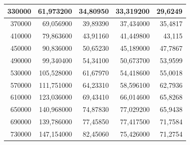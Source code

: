 \documentclass[a4paper, 12pt]{article}
\begin{document}
\begin{longtable}[c]{@{}rrrrr@{}}
	\multicolumn{1}{|r|}{330000}                  & \multicolumn{1}{r|}{61,973200}     & \multicolumn{1}{r|}{34,80950}      & \multicolumn{1}{r|}{33,319200}     & \multicolumn{1}{r|}{29,6249}       \\* \midrule
	\multicolumn{1}{|r|}{370000}                  & \multicolumn{1}{r|}{69,056900}     & \multicolumn{1}{r|}{39,89390}      & \multicolumn{1}{r|}{37,434000}     & \multicolumn{1}{r|}{35,4817}       \\* \midrule
	\multicolumn{1}{|r|}{410000}                  & \multicolumn{1}{r|}{79,863600}     & \multicolumn{1}{r|}{43,91160}      & \multicolumn{1}{r|}{41,449800}     & \multicolumn{1}{r|}{43,115}        \\* \midrule
	\multicolumn{1}{|r|}{450000}                  & \multicolumn{1}{r|}{90,836000}     & \multicolumn{1}{r|}{50,65230}      & \multicolumn{1}{r|}{45,189000}     & \multicolumn{1}{r|}{47,7867}       \\* \midrule
	\multicolumn{1}{|r|}{490000}                  & \multicolumn{1}{r|}{99,340400}     & \multicolumn{1}{r|}{54,34100}      & \multicolumn{1}{r|}{50,673700}     & \multicolumn{1}{r|}{53,9599}       \\* \midrule
	\multicolumn{1}{|r|}{530000}                  & \multicolumn{1}{r|}{105,528000}    & \multicolumn{1}{r|}{61,67970}      & \multicolumn{1}{r|}{54,418600}     & \multicolumn{1}{r|}{55,0018}       \\* \midrule
	\multicolumn{1}{|r|}{570000}                  & \multicolumn{1}{r|}{111,751000}    & \multicolumn{1}{r|}{64,23310}      & \multicolumn{1}{r|}{58,596100}     & \multicolumn{1}{r|}{62,7936}       \\* \midrule
	\multicolumn{1}{|r|}{610000}                  & \multicolumn{1}{r|}{123,036000}    & \multicolumn{1}{r|}{69,43410}      & \multicolumn{1}{r|}{66,014600}     & \multicolumn{1}{r|}{65,8268}       \\* \midrule
	\multicolumn{1}{|r|}{650000}                  & \multicolumn{1}{r|}{140,968000}    & \multicolumn{1}{r|}{74,87830}      & \multicolumn{1}{r|}{77,029200}     & \multicolumn{1}{r|}{65,9438}       \\* \midrule
	\multicolumn{1}{|r|}{690000}                  & \multicolumn{1}{r|}{139,786000}    & \multicolumn{1}{r|}{77,45850}      & \multicolumn{1}{r|}{77,417500}     & \multicolumn{1}{r|}{71,7584}       \\* \midrule
	\multicolumn{1}{|r|}{730000}                  & \multicolumn{1}{r|}{147,154000}    & \multicolumn{1}{r|}{82,45060}      & \multicolumn{1}{r|}{75,426000}     & \multicolumn{1}{r|}{71,2754}       \\* \midrule

\end{longtable}
\end{document}
